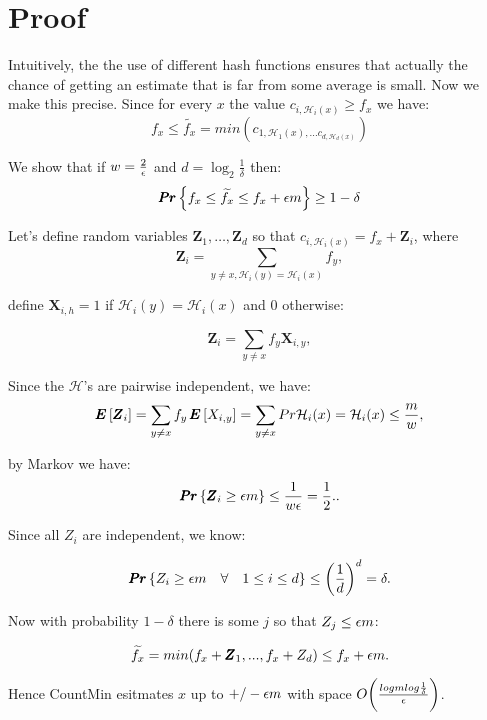 
\def\H{\mathcal{H}}              
\def\Z{\pmb{Z}}       
\def\X{\pmb{X}}       
\def\ci{c_{i,\H_i(x)}}       



\section*{Proof}


Intuitively, the the use of different hash functions ensures that 
actually the chance of getting an estimate that is far from some average is small. Now we make this precise. Since for every $x$ the value $\ci \ge f_x$ we have:
	\[
		f_x \le \widetilde{f_x} = min(c_{1,\H_1(x),...c_{d,\H_d(x)}})
	\]


 We show that if $w = \frac{2}{\epsilon}$ and $d = \log_2 \frac{1}{\delta}$ then:
	\[
		\Pr { f_x \le \widetilde{f_x} \le f_x + \eps m } \ge 1 - \delta
	\]

Let's define random variables $\Z_1,\ldots,\Z_d$ so that $\ci = f_x + \Z_i$, where
	\[
		\Z_i = \sum_{y \ne x, \H_i(y) = \H_i(x)} f_y,
	\]

define $\pmb{X}_{i,h} = 1$ if $\H_i(y) = \H_i(x)$ and $0$ otherwise:

	\[
		\Z_i = \sum_{y \ne x} f_y \pmb{X}_{i,y},
	\]

Since the $\H$'s are pairwise independent, we have:
	\[
		\E{\Z_i} = \sum_{y\ne x} f_y \E{ X_{i,y}} = \sum_{y\ne x} Pr{ \H_i(x) = \H_i(x)} \le \frac{m}{w},
	\]

by Markov we have:
	\[
		\Pr{ \Z_i \ge \eps m} \le \frac{1}{w \eps} = \frac{1}{2}..
	\]	


Since all $Z_i$ are independent, we know:

	\[
		\Pr{Z_i \ge \eps m \quad \forall \quad 1 \le i \le d} \le \bigg(\frac{1}{d}\bigg)^d = \delta.
	\]

Now with probability $1-\delta$ there is some $j$ so that $Z_j \le \epsilon m$:
	
	\[
		\widetilde{f_x} = min (f_x + \Z_1, ..., f_x + Z_d) \le f_x + \eps m.
	\]

Hence CountMin esitmates $x$ up to $+/- \epsilon m$ with space $O \bigg(  \frac{log m log \frac{1}{\delta}}{\epsilon} \bigg)$.










